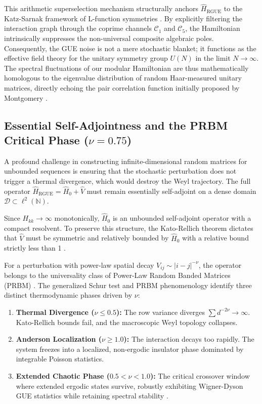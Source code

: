 \documentclass[aps,prl,preprint,superscriptaddress,floatfix]{revtex4-2}
\newcommand{\N}{\mathbb{N}}
\begin{document}
This arithmetic superselection mechanism structurally anchors $\hat{H}_{\text{RGUE}}$ to the Katz-Sarnak framework of L-function symmetries \cite{KatzSarnak1999}. By explicitly filtering the interaction graph through the coprime channels $\mathcal{C}_1$ and $\mathcal{C}_5$, the Hamiltonian intrinsically suppresses the non-universal composite algebraic poles. Consequently, the GUE noise is not a mere stochastic blanket; it functions as the effective field theory for the unitary symmetry group $U(N)$ in the limit $N \to \infty$. The spectral fluctuations of our modular Hamiltonian are thus mathematically homologous to the eigenvalue distribution of random Haar-measured unitary matrices, directly echoing the pair correlation function initially proposed by Montgomery \cite{Montgomery1973}.

\subsection{Essential Self-Adjointness and the PRBM Critical Phase (\texorpdfstring{$\nu = 0.75$}{nu = 0.75})}

A profound challenge in constructing infinite-dimensional random matrices for unbounded sequences is ensuring that the stochastic perturbation does not trigger a thermal divergence, which would destroy the Weyl trajectory. The full operator $\hat{H}_{\text{RGUE}} = \hat{H}_0 + \hat{V}$ must remain essentially self-adjoint on a dense domain $\mathcal{D} \subset \ell^2(\N)$.

Since $H_{kk} \to \infty$ monotonically, $\hat{H}_0$ is an unbounded self-adjoint operator with a compact resolvent. To preserve this structure, the Kato-Rellich theorem dictates that $\hat{V}$ must be symmetric and relatively bounded by $\hat{H}_0$ with a relative bound strictly less than 1 \cite{ReedSimon1975}. 

For a perturbation with power-law spatial decay $V_{ij} \sim |i-j|^{-\nu}$, the operator belongs to the universality class of Power-Law Random Banded Matrices (PRBM) \cite{Mirlin1996}. The generalized Schur test and PRBM phenomenology identify three distinct thermodynamic phases driven by $\nu$:
\begin{enumerate}
    \item \textbf{Thermal Divergence ($\nu \le 0.5$):} The row variance diverges $\sum d^{-2\nu} \to \infty$. Kato-Rellich bounds fail, and the macroscopic Weyl topology collapses.
    \item \textbf{Anderson Localization ($\nu \ge 1.0$):} The interaction decays too rapidly. The system freezes into a localized, non-ergodic insulator phase dominated by integrable Poisson statistics.
    \item \textbf{Extended Chaotic Phase ($0.5 < \nu < 1.0$):} The critical crossover window where extended ergodic states survive, robustly exhibiting Wigner-Dyson GUE statistics while retaining spectral stability \cite{Bourgade2020}.
\end{enumerate}
\end{document}
